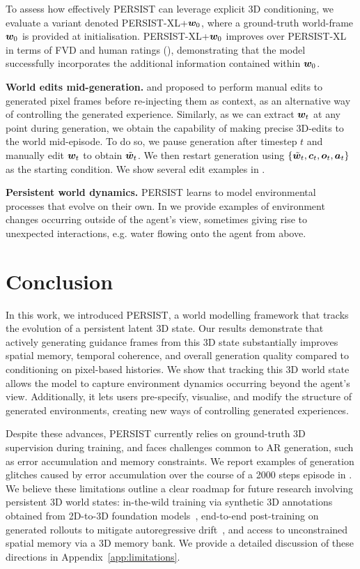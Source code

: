 \documentclass{article}
\theoremstyle{plain}
\theoremstyle{definition}
\theoremstyle{remark}
\begin{document}
To assess how effectively PERSIST can leverage explicit 3D conditioning, we evaluate a variant denoted PERSIST-XL+${\bm{w}}_0$, where a ground-truth world-frame ${\bm{w}}_0$ is provided at initialisation. PERSIST-XL+${\bm{w}}_0$ improves over PERSIST-XL in terms of FVD and human ratings (), demonstrating that the model successfully incorporates the additional information contained within ${\bm{w}}_0$. %

\textbf{World edits mid-generation.} \citet{valevski2024diffusionmodelsrealtimegame} and \citet{kanervisto2025world} proposed to perform manual edits to generated pixel frames before re-injecting them as context, as an alternative way of controlling the generated experience. Similarly, as we can extract ${\bm{w}}_t$ at any point during generation, we obtain the capability of making precise 3D-edits to the world mid-episode. To do so, we pause generation after timestep $t$ and manually edit ${\bm{w}}_t$ to obtain $\tilde{{\bm{w}}}_t$. We then restart generation using $\{\tilde{{\bm{w}}}_t, {\bm{c}}_t, {\bm{o}}_t, {\bm{a}}_t\}$ as the starting condition. We show several edit examples in .

\textbf{Persistent world dynamics.} PERSIST learns to model environmental processes that evolve on their own. In  we provide examples of environment changes occurring outside of the agent's view, sometimes giving rise to unexpected interactions, e.g. water flowing onto the agent from above.


\section{Conclusion}

In this work, we introduced PERSIST, a world modelling framework that tracks the evolution of a persistent latent 3D state. Our results demonstrate that actively generating guidance frames from this 3D state substantially improves spatial memory, temporal coherence, and overall generation quality compared to conditioning on pixel-based histories. We show that tracking this 3D world state allows the model to capture environment dynamics occurring beyond the agent's view. Additionally, it lets users pre-specify, visualise, and modify the structure of generated environments, creating new ways of controlling generated experiences.

Despite these advances, PERSIST currently relies on ground-truth 3D supervision during training, and faces challenges common to AR generation, such as error accumulation and memory constraints. We report examples of generation glitches caused by error accumulation over the course of a 2000 steps episode in . We believe these limitations outline a clear roadmap for future research involving persistent 3D world states: in-the-wild training via synthetic 3D annotations obtained from 2D-to-3D foundation models~\citep{wang2025vggt,sam3dteam2025sam3d3dfyimages}, end-to-end post-training on generated rollouts to mitigate autoregressive drift~\citep{huang2025self}, and access to unconstrained spatial memory via a 3D memory bank. We provide a detailed discussion of these directions in Appendix~\ref{app:limitations}.
\end{document}

